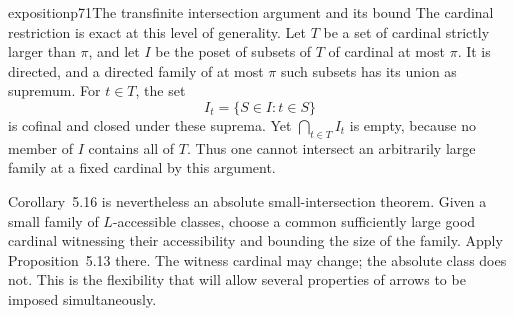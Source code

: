 \begin{dcomment}{exposition}{p71}{The transfinite intersection argument and its bound}
The cardinal restriction is exact at this level of generality. Let $T$ be a set of cardinal strictly larger than $\pi$, and let $I$ be the poset of subsets of $T$ of cardinal at most $\pi$. It is directed, and a directed family of at most $\pi$ such subsets has its union as supremum. For $t\in T$, the set
\[
 I_t=\{S\in I:t\in S\}
\]
is cofinal and closed under these suprema. Yet $\bigcap_{t\in T}I_t$ is empty, because no member of $I$ contains all of $T$. Thus one cannot intersect an arbitrarily large family at a fixed cardinal by this argument.

Corollary~5.16 is nevertheless an absolute small-intersection theorem. Given a small family of $L$-accessible classes, choose a common sufficiently large good cardinal witnessing their accessibility and bounding the size of the family. Apply Proposition~5.13 there. The witness cardinal may change; the absolute class does not. This is the flexibility that will allow several properties of arrows to be imposed simultaneously.
\end{dcomment}

